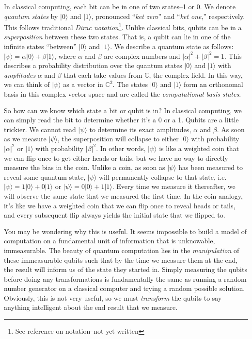 \documentclass[12pt,twoside]{reedthesis}
\theoremstyle{definition}
\newcommand{\C}{\mathbb{C}}
\newcommand{\ketz}{\ensuremath{\lvert 0\rangle}\xspace}
\newcommand{\keto}{\ensuremath{\lvert 1\rangle}\xspace}
\newcommand{\ketpsi}{\ensuremath{|\psi\rangle}\xspace}
\begin{document}
In classical computing, each bit can be in one of two states--1 or 0.  We denote \textit{quantum states} by \ketz and \keto, pronounced ``\textit{ket zero}'' and ``\textit{ket one},'' respectively. This follows traditional \textit{Dirac notation}\footnote{See reference on notation--not yet written}. Unlike classical bits, qubits can be in a \textit{superposition} between these two states. That is, a qubit can lie in one of the infinite states ``between'' \ketz and \keto. We describe a quantum state as follows: $\ketpsi = \alpha \ketz + \beta \keto$, where $\alpha$ and $\beta$ are complex numbers and $\lvert \alpha \rvert ^2+ \lvert \beta \rvert ^2= 1$. This describes a probability distribution over the quantum states \ketz and \keto with \textit{amplitudes} $\alpha$ and $\beta$ that each take values from $\C$, the complex field. In this way, we can think of \ketpsi as a vector in $\C^2$. The states \ketz and \keto form an orthonomal basis in this complex vector space and are called the \textit{computational basis states}.

So how can we know which state a bit or qubit is in? In classical computing, we can simply read the bit to determine whether it's a 0 or a 1. Qubits are a little trickier. We cannot read \ketpsi to determine its exact amplitudes, $\alpha$ and $\beta$. As soon as we measure \ketpsi, the superposition will collapse to either \ketz with probability $ \lvert \alpha \rvert ^2$ or \keto with probability $ \lvert \beta \rvert ^2$. In other words, \ketpsi is like a weighted coin that we can flip once to get either heads or tails, but we have no way to directly measure the bias in the coin. Unlike a coin, as soon as \ketpsi has been measured to reveal some quantum state, \ketpsi will permanently collapse to that state, i.e.~$\ketpsi = 1\ketz + 0 \keto$ or $\ketpsi = 0\ketz + 1\keto$. Every time we measure it thereafter, we will observe the same state that we measured the first time. In the coin analogy, it's like we have a weighted coin that we can flip once to reveal heads or tails, and every subsequent flip always yields the initial state that we flipped to.

You may be wondering why this is useful. It seems impossible to build a model of computation on a fundamental unit of information that is unknowable, immeasurable. The beauty of quantum computation lies in the \textit{manipulation} of these immeasurable qubits such that by the time we measure them at the end, the result will inform us of the state they started in. Simply measuring the qubits before doing any transformations is fundamentally the same as  running a random number generator on a classical computer and trying a random possible solution. Obviously, this is not very useful, so we must \textit{transform} the qubits to say anything intelligent about the end result that we measure.
\end{document}
